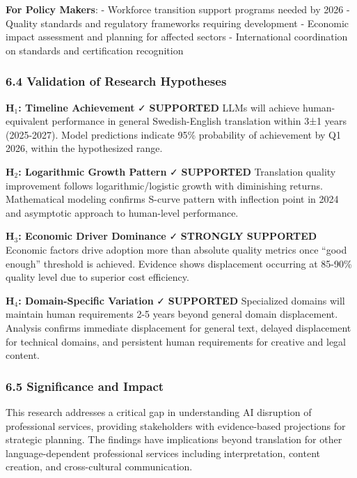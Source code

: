 \documentclass[12pt,a4paper]{article}
\begin{document}
{{{{{\textbf{For Policy Makers}: - Workforce transition support programs
needed by 2026 - Quality standards and regulatory frameworks requiring
development - Economic impact assessment and planning for affected
sectors - International coordination on standards and certification
recognition

\hypertarget{validation-of-research-hypotheses}{%
\subsubsection{6.4 Validation of Research
Hypotheses}\label{validation-of-research-hypotheses}}

\textbf{H$_1$: Timeline Achievement} ✓ \textbf{SUPPORTED} LLMs will achieve
human-equivalent performance in general Swedish-English translation
within 3±1 years (2025-2027). Model predictions indicate 95\%
probability of achievement by Q1 2026, within the hypothesized range.

\textbf{H$_2$: Logarithmic Growth Pattern} ✓ \textbf{SUPPORTED} Translation
quality improvement follows logarithmic/logistic growth with diminishing
returns. Mathematical modeling confirms S-curve pattern with inflection
point in 2024 and asymptotic approach to human-level performance.

\textbf{H$_3$: Economic Driver Dominance} ✓ \textbf{STRONGLY SUPPORTED}
Economic factors drive adoption more than absolute quality metrics once
``good enough'' threshold is achieved. Evidence shows displacement
occurring at 85-90\% quality level due to superior cost efficiency.

\textbf{H$_4$: Domain-Specific Variation} ✓ \textbf{SUPPORTED} Specialized
domains will maintain human requirements 2-5 years beyond general domain
displacement. Analysis confirms immediate displacement for general text,
delayed displacement for technical domains, and persistent human
requirements for creative and legal content.

\hypertarget{significance-and-impact}{%
\subsubsection{6.5 Significance and
Impact}\label{significance-and-impact}}

This research addresses a critical gap in understanding AI disruption of
professional services, providing stakeholders with evidence-based
projections for strategic planning. The findings have implications
beyond translation for other language-dependent professional services
including interpretation, content creation, and cross-cultural
communication.

}}}}}
\end{document}
